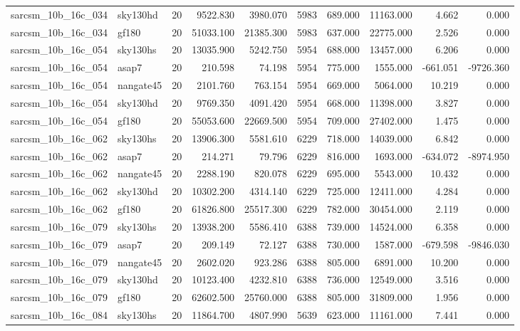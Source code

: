 \begin{tabular}{llrrrrrrrr}
sarcsm\_10b\_16c\_034 & sky130hd & 20 & 9522.830 & 3980.070 & 5983 & 689.000 & 11163.000 & 4.662 & 0.000 \\
sarcsm\_10b\_16c\_034 & gf180 & 20 & 51033.100 & 21385.300 & 5983 & 637.000 & 22775.000 & 2.526 & 0.000 \\
sarcsm\_10b\_16c\_054 & sky130hs & 20 & 13035.900 & 5242.750 & 5954 & 688.000 & 13457.000 & 6.206 & 0.000 \\
sarcsm\_10b\_16c\_054 & asap7 & 20 & 210.598 & 74.198 & 5954 & 775.000 & 1555.000 & -661.051 & -9726.360 \\
sarcsm\_10b\_16c\_054 & nangate45 & 20 & 2101.760 & 763.154 & 5954 & 669.000 & 5064.000 & 10.219 & 0.000 \\
sarcsm\_10b\_16c\_054 & sky130hd & 20 & 9769.350 & 4091.420 & 5954 & 668.000 & 11398.000 & 3.827 & 0.000 \\
sarcsm\_10b\_16c\_054 & gf180 & 20 & 55053.600 & 22669.500 & 5954 & 709.000 & 27402.000 & 1.475 & 0.000 \\
sarcsm\_10b\_16c\_062 & sky130hs & 20 & 13906.300 & 5581.610 & 6229 & 718.000 & 14039.000 & 6.842 & 0.000 \\
sarcsm\_10b\_16c\_062 & asap7 & 20 & 214.271 & 79.796 & 6229 & 816.000 & 1693.000 & -634.072 & -8974.950 \\
sarcsm\_10b\_16c\_062 & nangate45 & 20 & 2288.190 & 820.078 & 6229 & 695.000 & 5543.000 & 10.432 & 0.000 \\
sarcsm\_10b\_16c\_062 & sky130hd & 20 & 10302.200 & 4314.140 & 6229 & 725.000 & 12411.000 & 4.284 & 0.000 \\
sarcsm\_10b\_16c\_062 & gf180 & 20 & 61826.800 & 25517.300 & 6229 & 782.000 & 30454.000 & 2.119 & 0.000 \\
sarcsm\_10b\_16c\_079 & sky130hs & 20 & 13938.200 & 5586.410 & 6388 & 739.000 & 14524.000 & 6.358 & 0.000 \\
sarcsm\_10b\_16c\_079 & asap7 & 20 & 209.149 & 72.127 & 6388 & 730.000 & 1587.000 & -679.598 & -9846.030 \\
sarcsm\_10b\_16c\_079 & nangate45 & 20 & 2602.020 & 923.286 & 6388 & 805.000 & 6891.000 & 10.200 & 0.000 \\
sarcsm\_10b\_16c\_079 & sky130hd & 20 & 10123.400 & 4232.810 & 6388 & 736.000 & 12549.000 & 3.516 & 0.000 \\
sarcsm\_10b\_16c\_079 & gf180 & 20 & 62602.500 & 25760.000 & 6388 & 805.000 & 31809.000 & 1.956 & 0.000 \\
sarcsm\_10b\_16c\_084 & sky130hs & 20 & 11864.700 & 4807.990 & 5639 & 623.000 & 11161.000 & 7.441 & 0.000 \\

\end{tabular}
